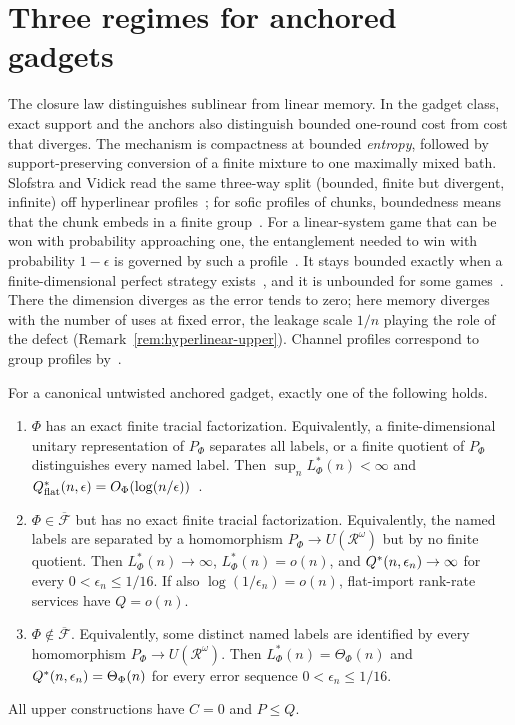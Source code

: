 \section{Three regimes for anchored gadgets}\label{sec:classification}

The closure law distinguishes sublinear from linear memory. In the gadget class, exact support and the anchors
also distinguish bounded one-round cost from cost that diverges. The mechanism is compactness at bounded
\emph{entropy}, followed by support-preserving conversion of a finite mixture to one maximally mixed bath.
Slofstra and Vidick read the same three-way split (bounded, finite but divergent, infinite) off hyperlinear
profiles~\cite[Section~2]{SlofstraVidick2018}; for sofic profiles of chunks, boundedness means that the chunk embeds in
a finite group~\cite[Fact~3.5]{Cornulier2013}. For a linear-system game that can be won with probability approaching one,
the entanglement needed to win with probability $1-\epsilon$ is governed by such a
profile~\cite[Corollaries~5.2 and~5.3]{SlofstraVidick2018}. It stays bounded exactly when a finite-dimensional perfect
strategy exists~\cite{CleveMittal2014,CleveLiuSlofstra2017}, and it is unbounded for some
games~\cite{Slofstra2019,Slofstra2020}. There the dimension diverges as the error tends to zero; here memory diverges
with the number of uses at fixed error, the leakage scale $1/n$ playing the role of the defect
(Remark~\ref{rem:hyperlinear-upper}). Channel profiles correspond to group profiles by~\cite[Theorem~9.2]{DouglasMghirbiB}.

\begin{theorem}\label{thm:trichotomy}
For a canonical untwisted anchored gadget, exactly one of the following holds.
\begin{enumerate}[label=(\roman*),itemsep=3pt]
\item $\Phi$ has an exact finite tracial factorization. Equivalently, a finite-dimensional unitary
representation of $P_\Phi$ separates all labels, or a finite quotient
of $P_\Phi$ distinguishes every named label. Then $\sup_n L^*_\Phi(n)<\infty$ and
$Q^{*}_{\rm flat}(n,\epsilon)=O_\Phi(\log(n/\epsilon))$~\cite[Theorem~8.6]{DouglasMghirbiB}.
\item $\Phi\in\overline{\mathcal F}$ but has no exact finite tracial factorization.
Equivalently, the named labels are separated by a homomorphism
$P_\Phi\to U(\mathcal R^\omega)$ but by no finite quotient. Then
$L^*_\Phi(n)\to\infty$, $L^*_\Phi(n)=o(n)$, and $Q^{*}(n,\epsilon_n)\to\infty$ for every
$0<\epsilon_n\le1/16$. If also $\log(1/\epsilon_n)=o(n)$, flat-import rank-rate services have $Q=o(n)$.
\item $\Phi\notin\overline{\mathcal F}$. Equivalently, some distinct named
labels are identified by every homomorphism
$P_\Phi\to U(\mathcal R^\omega)$. Then $L^*_\Phi(n)=\Theta_\Phi(n)$ and
$Q^{*}(n,\epsilon_n)=\Theta_\Phi(n)$ for every error sequence $0<\epsilon_n\le1/16$.
\end{enumerate}
All upper constructions have $C=0$ and $P\le Q$.
\end{theorem}


